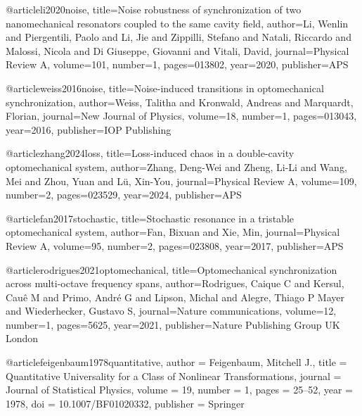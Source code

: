 @article{li2020noise,
  title={Noise robustness of synchronization of two nanomechanical resonators coupled to the same cavity field},
  author={Li, Wenlin and Piergentili, Paolo and Li, Jie and Zippilli, Stefano and Natali, Riccardo and Malossi, Nicola and Di Giuseppe, Giovanni and Vitali, David},
  journal={Physical Review A},
  volume={101},
  number={1},
  pages={013802},
  year={2020},
  publisher={APS}
}

@article{weiss2016noise,
  title={Noise-induced transitions in optomechanical synchronization},
  author={Weiss, Talitha and Kronwald, Andreas and Marquardt, Florian},
  journal={New Journal of Physics},
  volume={18},
  number={1},
  pages={013043},
  year={2016},
  publisher={IOP Publishing}
}

@article{zhang2024loss,
  title={Loss-induced chaos in a double-cavity optomechanical system},
  author={Zhang, Deng-Wei and Zheng, Li-Li and Wang, Mei and Zhou, Yuan and L{\"u}, Xin-You},
  journal={Physical Review A},
  volume={109},
  number={2},
  pages={023529},
  year={2024},
  publisher={APS}
}

@article{fan2017stochastic,
  title={Stochastic resonance in a tristable optomechanical system},
  author={Fan, Bixuan and Xie, Min},
  journal={Physical Review A},
  volume={95},
  number={2},
  pages={023808},
  year={2017},
  publisher={APS}
}

@article{rodrigues2021optomechanical,
  title={Optomechanical synchronization across multi-octave frequency spans},
  author={Rodrigues, Caique C and Kersul, Cau{\^e} M and Primo, Andr{\'e} G and Lipson, Michal and Alegre, Thiago P Mayer and Wiederhecker, Gustavo S},
  journal={Nature communications},
  volume={12},
  number={1},
  pages={5625},
  year={2021},
  publisher={Nature Publishing Group UK London}
}

@article{feigenbaum1978quantitative,
  author = {Feigenbaum, Mitchell J.},
  title = {Quantitative Universality for a Class of Nonlinear Transformations},
  journal = {Journal of Statistical Physics},
  volume = {19},
  number = {1},
  pages = {25--52},
  year = {1978},
  doi = {10.1007/BF01020332},
  publisher = {Springer}
}
